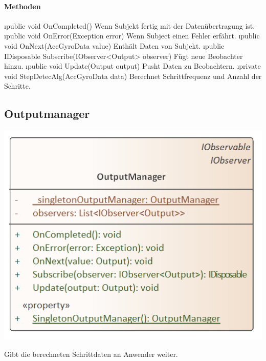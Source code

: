 \documentclass[../entwurf.tex]{subfiles}
\begin{document}
        \paragraph{Methoden}
        \begin{itemize}
            \i{public void OnCompleted()} Wenn Subjekt fertig mit der Datenübertragung ist.
            \i{public void OnError(Exception error)} Wenn Subject einen Fehler erfährt.
            \i{public void OnNext(AccGyroData value)} Enthält Daten von Subjekt.
            \i{public IDisposable Subscribe(IObserver<Output> observer)} Fügt neue Beobachter hinzu.
            \i{public void Update(Output output)} Pusht Daten zu Beobachtern.
            \i{private void StepDetecAlg(AccGyroData data)} Berechnet Schrittfrequenz und Anzahl der Schritte.
        \end{itemize}
    
    \subsection{Outputmanager}
    	\begin{minipage}{0.75\textwidth}
    		  \includegraphics[scale=0.75]{../uml_klassen/StepDetectionLib/OutputManager.png}
    	\end{minipage}
    	\begin{minipage}{0.25\textwidth}	
        Gibt die berechneten Schrittdaten an Anwender weiter.
    	\end{minipage}
    	
\end{document}
